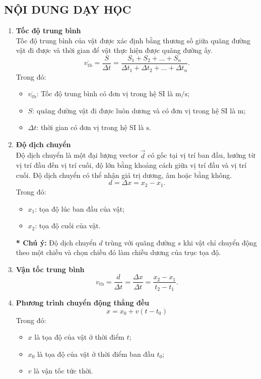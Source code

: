 \subsection{NỘI DUNG DẠY HỌC}
\begin{enumerate}[label=\bfseries\Roman*.]
\item \textbf{Tốc độ trung bình}\\ Tốc độ trung bình của vật được xác định bằng thương số giữa quãng đường vật đi được và thời gian để vật thực hiện được quãng đường ấy.
$$\overline{v_{\mathrm{tb}}}=\dfrac{S}{\Delta t}=\dfrac{S_1+S_2+\dots+S_n}{\Delta t_1+\Delta t_2+\dots+\Delta t_n}.$$
Trong đó:
\begin{itemize}
	\item $\overline{v_{\mathrm{tb}}}$: Tốc độ trung bình có đơn vị trong hệ SI là $\si{\meter/\second}$;
	\item $S$: quãng đường vật đi được luôn dương và có đơn vị trong hệ SI là $\si{\meter}$;
	\item $\Delta t$: thời gian có đơn vị trong hệ SI là $\si{\second}$.
\end{itemize}	
	\item \textbf{Độ dịch chuyển}\\ Độ dịch chuyển là một đại lượng vector $\vec{d}$ có gốc tại vị trí ban đầu, hướng từ vị trí đầu đến vị trí cuối, độ lớn bằng khoảng cách giữa vị trí đầu và vị trí cuối. Độ dịch chuyển có thể nhận giá trị dương, âm hoặc bằng không.
	$$d=\Delta x=x_2-x_1.$$
	Trong đó:
	\begin{itemize}
		\item $x_1$: tọa độ lúc ban đầu của vật;
		\item $x_2$: tọa độ cuối của vật.
	\end{itemize}
	\textbf{* Chú ý:} Độ dịch chuyển $d$ trùng với quãng đường $s$ khi vật chỉ chuyển động theo một chiều và chọn chiều đó làm chiều dương của trục tọa độ.
	\item \textbf{Vận tốc trung bình}
	$$v_{\mathrm{tb}}=\dfrac{d}{\Delta t}=\dfrac{\Delta x}{\Delta t}=\dfrac{x_2-x_1}{t_2-t_1}.$$
	\item \textbf{Phương trình chuyển động thẳng đều}
	$$x=x_0+v\left(t-t_0\right)$$
	Trong đó:
	\begin{itemize}
		\item $x$ là tọa độ của vật ở thời điểm $t$;
		\item $x_0$ là tọa độ của vật ở thời điểm ban đầu $t_0$;
		\item $v$ là vận tốc tức thời.
	\end{itemize}

\end{enumerate}
